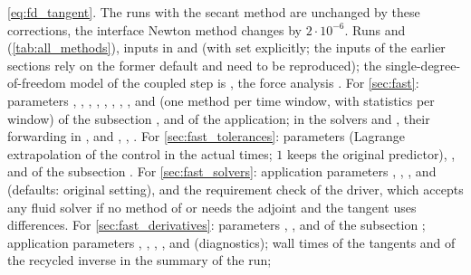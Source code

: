 \documentclass[11pt,a4paper]{article}
\theoremstyle{definition}
\theoremstyle{remark}
\begin{document}
\eqref{eq:fd_tangent}. The runs with the secant method are unchanged by these corrections, the
interface Newton method changes by $2\cdot10^{-6}$. Runs  and  (\cref{tab:all_methods}), inputs in  and 
(with  set explicitly; the inputs of the earlier sections rely on the former
default and need  to be reproduced); the single-degree-of-freedom model of the coupled step is
, the force analysis
. For \cref{sec:fast}: parameters , ,
, , ,
, , ,
 and  (one method per time window, with
statistics per window) of the subsection , and  of
the application; in the solvers  and
, their forwarding in , and
, ,
. For \cref{sec:fast_tolerances}: parameters
 (Lagrange extrapolation of the control in the actual times; $1$
keeps the original predictor), ,  and
 of the subsection . For \cref{sec:fast_solvers}: application
parameters , ,
,  and
 (defaults: original setting), and the requirement check of
the driver, which accepts any fluid solver if no method of  or 
needs the adjoint and the tangent uses differences. For \cref{sec:fast_derivatives}: parameters
, ,  and
 of the subsection ; application
parameters , , ,
,  and 
(diagnostics); wall times of the tangents and of the recycled inverse in the summary of the run;
\end{document}
